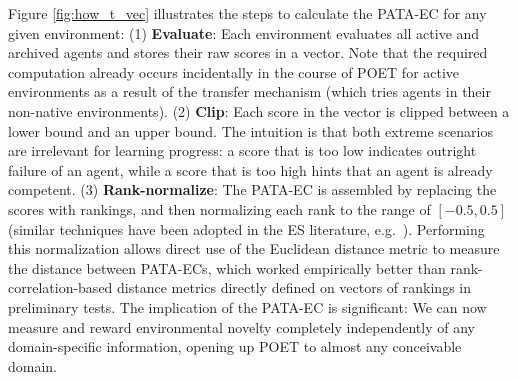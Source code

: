 \documentclass{article}
\newcommand{\ks}[1]{\comments{\textcolor{purple}{[Ken: #1]}}}
\newcommand{\rwang}[1]{\comments{\textcolor{blue}{[Rui: #1]}}}
\newcommand{\comments}[1]{#1} %
\begin{document}
Figure \ref{fig:how_t_vec} illustrates the steps to calculate the PATA-EC for any given environment: (1) \textbf{Evaluate}: Each environment evaluates all active and archived 
agents and stores their raw scores in a vector. Note that the required computation already occurs incidentally in the course of POET for active environments as a result of the  transfer mechanism (which tries agents in their non-native environments). (2) \textbf{Clip}: Each score in the vector is clipped between a lower bound and an upper bound. 
The intuition is that both extreme scenarios are irrelevant for learning progress: a score that is too low indicates outright failure of an agent, while a score that is too high hints that an agent is already competent. (3) \textbf{Rank-normalize}: The PATA-EC is assembled by replacing the scores with rankings, and then normalizing each rank to the range of $[-0.5, 0.5]$ (similar techniques have been adopted in the ES literature, e.g.\ \citet{wierstra2014natural,salimans2017evolution}). Performing this normalization allows direct use of the Euclidean distance metric to measure the distance between PATA-ECs, which worked empirically better than rank-correlation-based distance metrics directly defined on vectors of rankings in preliminary tests. The implication of the PATA-EC is significant: We can now measure and reward environmental novelty completely independently of any domain-specific information, opening up POET to almost any conceivable domain.






\end{document}
